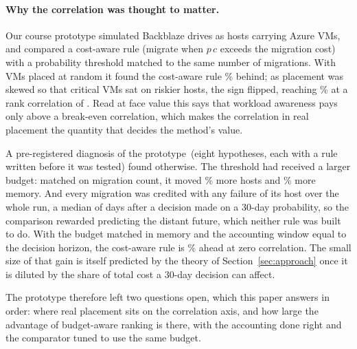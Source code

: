 \paragraph{Why the correlation was thought to matter.}
\label{sec:v1}
Our course prototype simulated \VVOneHosts{} Backblaze drives as hosts carrying Azure VMs, and
compared a cost-aware rule (migrate when $p\,c$ exceeds the migration cost) with a probability
threshold matched to the same number of migrations. With VMs placed at random it found the
cost-aware rule \VVOneAdvRandom\% behind; as placement was skewed so that critical VMs sat on
riskier hosts, the sign flipped, reaching \VVOneAdvTop\% at a rank correlation of \VVOneRhoTop. Read at face value
this says that workload awareness pays only above a break-even correlation, which makes the
correlation in real placement the quantity that decides the method's value.

A pre-registered diagnosis of the prototype~(eight hypotheses, each with a rule written before it
was tested) found otherwise. The threshold had received a larger budget: matched on migration
count, it moved \VVOneExtraHosts\% more hosts and \VVOneExtraGB\% more memory. And every migration was credited with any
failure of its host over the whole run, a median of \VVOneMedianLeadDays{} days after a decision
made on a 30-day probability, so the comparison rewarded predicting the distant future, which
neither rule was built to do. With the budget matched in memory and the accounting window equal
to the decision horizon, the cost-aware rule is \VVOneAdvAligned\% ahead at zero correlation.
The small size of that gain is itself predicted by the theory of Section~\ref{sec:approach} once
it is diluted by the share of total cost a 30-day decision can affect.

The prototype therefore left two questions open, which this paper answers in order: where real
placement sits on the correlation axis, and how large the advantage of budget-aware ranking is
there, with the accounting done right and the comparator tuned to use the same budget.
